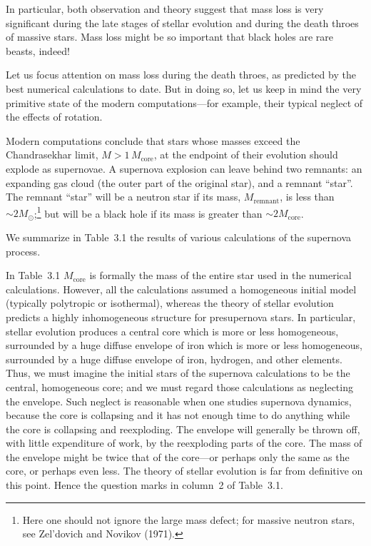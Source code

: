 

In particular, both observation and theory suggest that mass loss is very
significant during the late stages of stellar evolution and during the death throes
of massive stars. Mass loss might be so important that black holes are rare
beasts, indeed!

Let us focus attention on mass loss during the death throes, as predicted by
the best numerical calculations to date. But in doing so, let us keep in mind the
very primitive state of the modern computations---for example, their typical
neglect of the effects of rotation.

Modern computations conclude that stars whose masses exceed the
Chandrasekhar limit, $M > 1 \, M_\text{core}$, at the endpoint of their evolution should
explode as supernovae. A supernova explosion can leave behind two remnants: an
expanding gas cloud (the outer part of the original star), and a remnant ``star''.
The remnant ``star'' will be a neutron star if its mass, $M_\text{remnant}$, is less than $\sim 2M_\odot$;\footnote{Here one should not ignore the large mass defect; for massive neutron stars, see Zel'dovich and Novikov (1971).}
but will be a black hole if its mass is greater than $\sim 2 M_\text{core}$.

We summarize in Table~3.1 the results of various calculations of the supernova
process.

In Table~3.1 $M_\text{core}$ is formally the mass of the entire star used in the numerical
calculations. However, all the calculations assumed a homogeneous initial model
(typically polytropic or isothermal), whereas the theory of stellar evolution
predicts a highly inhomogeneous structure for presupernova stars. In particular,
stellar evolution produces a central core which is more or less homogeneous,
surrounded by a huge diffuse envelope of iron which is more or less homogeneous,
surrounded by a huge diffuse envelope of iron, hydrogen, and other
elements. Thus, we must imagine the initial stars of the supernova calculations to
be the central, homogeneous core; and we must regard those calculations as
neglecting the envelope. Such neglect is reasonable when one studies supernova
dynamics, because the core is collapsing and it has not enough time to do
anything while the core is collapsing and reexploding. The envelope will generally
be thrown off, with little expenditure of work, by the reexploding parts of the
core. The mass of the envelope might be twice that of the core---or perhaps only
the same as the core, or perhaps even less. The theory of stellar evolution is far
from definitive on this point. Hence the question marks in column~2 of Table~3.1.

